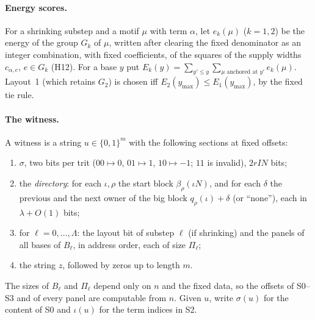 \documentclass[11pt]{article}
\theoremstyle{definition}
\theoremstyle{remark}
\begin{document}
\paragraph{Energy scores.} For a shrinking substep and a motif $\mu$ with term $\alpha$, let $e_k(\mu)$ ($k=1,2$) be the energy
of the group $G_k$ of $\mu$, written after clearing the fixed denominator as an integer combination, with fixed coefficients, of the
squares of the supply widths $c_{\alpha,e}$, $e\in G_k$ (H12). For a base $y$ put $E_k(y)=\sum_{y'\le y}\sum_{\mu\text{ anchored
at }y'}e_k(\mu)$. Layout~1 (which retains $G_2$) is chosen iff $E_2(y_{\max})\le E_1(y_{\max})$, by the fixed tie rule.

\paragraph{The witness.} A witness is a string $u\in\{0,1\}^m$ with the following sections at fixed offsets:
\begin{enumerate}
\item[S0] $\sigma$, two bits per trit ($00\mapsto0$, $01\mapsto1$, $10\mapsto-1$; $11$ is invalid), $2rIN$ bits;
\item[S1] the \emph{directory}: for each $\iota,\rho$ the start block $\beta_\rho(\iota N)$, and for each $\delta$ the previous and
  the next owner of the big block $q_\rho(\iota)+\delta$ (or ``none''), each in $\lambda+O(1)$ bits;
\item[S2] for $\ell=0,\dots,\Lambda$: the layout bit of substep $\ell$ (if shrinking) and the panels of all bases of $B_\ell$, in
  address order, each of size $\Pi_\ell$;
\item[S3] the string $z$, followed by zeros up to length $m$.
\end{enumerate}
The sizes of $B_\ell$ and $\Pi_\ell$ depend only on $n$ and the fixed data, so the offsets of S0--S3 and of every panel are
computable from $n$. Given $u$, write $\sigma(u)$ for the content of S0 and $\iota(u)$ for the term indices in S2.
\end{document}
